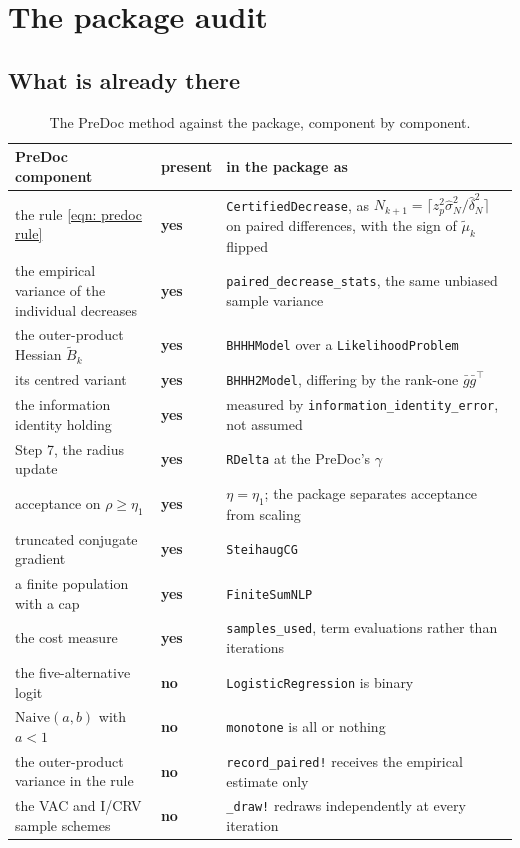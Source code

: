 \documentclass[11pt,a4paper]{article}
\newcommand{\YES}{\textcolor{green!45!black}{\textbf{yes}}}
\newcommand{\NO}{\textcolor{red!70!black}{\textbf{no}}}
\begin{document}
\section{The package audit}\label{sec: audit}

\subsection{What is already there}

\begin{table}[H]
  \centering\small
  \caption{The PreDoc method against the package, component by component.}
  \label{tab: audit}
  \begin{tabular}{p{} p{} p{}}
    \toprule
    PreDoc component & present & in the package as \\
    \midrule
    the rule \eqref{eqn: predoc rule} & \YES
      & \texttt{CertifiedDecrease}, as
        $N_{k+1} = \lceil z_p^2\hat\sigma_N^2/\hat\delta_N^2\rceil$ on paired
        differences, with the sign of $\tilde\mu_k$ flipped \\
    the empirical variance of the individual decreases & \YES
      & \texttt{paired\_decrease\_stats}, the same unbiased sample variance \\
    the outer-product Hessian $\tilde B_k$ & \YES
      & \texttt{BHHHModel} over a \texttt{LikelihoodProblem} \\
    its centred variant & \YES
      & \texttt{BHHH2Model}, differing by the rank-one $\bar g\bar g^{\!\top}$ \\
    the information identity holding & \YES
      & measured by \texttt{information\_identity\_error}, not assumed \\
    Step 7, the radius update & \YES & \texttt{RDelta} at the PreDoc's $\gamma$ \\
    acceptance on $\rho \geq \eta_1$ & \YES
      & $\eta = \eta_1$; the package separates acceptance from scaling \\
    truncated conjugate gradient & \YES & \texttt{SteihaugCG} \\
    a finite population with a cap & \YES & \texttt{FiniteSumNLP} \\
    the cost measure & \YES
      & \texttt{samples\_used}, term evaluations rather than iterations \\
    \midrule
    the five-alternative logit & \NO & \texttt{LogisticRegression} is binary \\
    $\text{Naive}(a,b)$ with $a < 1$ & \NO
      & \texttt{monotone} is all or nothing \\
    the outer-product variance in the rule & \NO
      & \texttt{record\_paired!} receives the empirical estimate only \\
    the VAC and I/CRV sample schemes & \NO
      & \texttt{\_draw!} redraws independently at every iteration \\
    \bottomrule
  \end{tabular}
\end{table}
\end{document}
